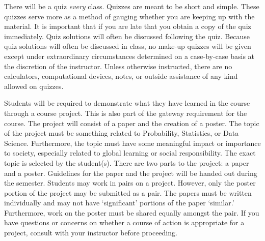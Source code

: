 \documentclass[11pt,letterpaper]{article}
\begin{document}
There will be a quiz \textit{every} class. Quizzes are meant to be short and simple. These quizzes serve more as a method of gauging whether you are keeping up with the material. It is important that if you are late that you obtain a copy of the quiz immediately. Quiz solutions will often be discussed following the quiz. Because quiz solutions will often be discussed in class, no make-up quizzes will be given except under extraordinary circumstances determined on a case-by-case basis at the discretion of the instructor. Unless otherwise instructed, there are no calculators, computational devices, notes, or outside assistance of any kind allowed on quizzes. \pspace



\newpage



Students will be required to demonstrate what they have learned in the course through a course project. This is also part of the gateway requirement for the course. The project will consist of a paper and the creation of a poster. The topic of the project must be something related to Probability, Statistics, or Data Science. Furthermore, the topic must have some meaningful impact or importance to society, especially related to global learning or social responsibility. The exact topic is selected by the student(s). There are two parts to the project: a paper and a poster. Guidelines for the paper and the project will be handed out during the semester. Students may work in pairs on a project. However, only the poster portion of the project may be submitted as a pair. The papers must be written individually and may not have `significant' portions of the paper `similar.' Furthermore, work on the poster must be shared equally amongst the pair. If you have questions or concerns on whether a course of action is appropriate for a project, consult with your instructor before proceeding. \sectionbreak
\end{document}
